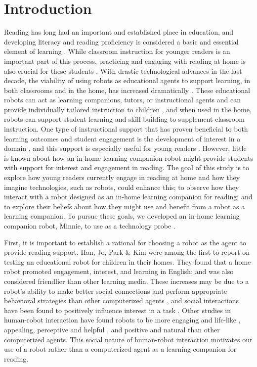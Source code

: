 \documentclass{sigchi}
\begin{document}
\section{Introduction}

Reading has long had an important and established place in education, and developing literacy and reading proficiency is considered a basic and essential element of learning \cite{McCormick:1994,Freire:1983}.  While classroom instruction for younger readers is an important part of this process, practicing and engaging with reading at home is also crucial for these students \cite{Baker:1997}.  With drastic technological advances in the last decade, the viability of using robots as educational agents to support learning, in both classrooms and in the home, has increased dramatically \cite{Benitti:2012}. These educational robots can act as learning companions, tutors,  or instructional agents and can provide individually tailored instruction to children \cite{Miller:2008}, and when used in the home, robots can support student learning and skill building to supplement classroom instruction. One type of instructional support that has proven beneficial to both learning outcomes and student engagement is the development of interest in a domain \cite{Hidi:2006}, and this support is especially useful for young readers \cite{Jones:2011}.  However, little is known about how an in-home learning companion robot might provide students with support for interest and engagement in reading. The goal of this study is to explore how young readers currently engage in reading at home and how they imagine technologies, such as robots, could enhance this; to observe how they interact with a robot designed as an in-home learning companion for reading; and to explore their beliefs about how they might use and benefit from a robot as a learning companion. To pursue these goals, we developed an in-home learning companion robot, Minnie, to use as a technology probe \cite{Hutchinson:2003}.

First, it is important to establish a rational for choosing a robot as the agent to provide reading support. Han, Jo, Park \& Kim \cite{Han:2005} were among the first to report on testing an educational robot for children in their homes. They found that a home robot promoted engagement, interest, and learning in English; and was also considered friendlier than other learning media. These increases may be due to a robot's ability to make better social connections and perform appropriate behavioral strategies than other computerized agents \cite{Brown:2013}, and social interactions have been found to positively influence interest in a task \cite{Sansone:2005}.  Other studies in human-robot interaction have found robots to be more engaging and life-like \cite{Kiesler:2008}, appealing, perceptive and helpful \cite{Wainer:2007}, and positive and natural \cite{Bainbridge:2011} than other computerized agents. This social nature of human-robot interaction motivates our use of a robot rather than a computerized agent as a learning companion for reading.
\end{document}
